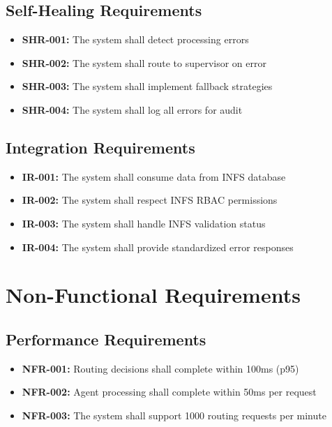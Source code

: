 \subsection{Self-Healing Requirements}

\begin{itemize}
    \item \textbf{SHR-001:} The system shall detect processing errors
    \item \textbf{SHR-002:} The system shall route to supervisor on error
    \item \textbf{SHR-003:} The system shall implement fallback strategies
    \item \textbf{SHR-004:} The system shall log all errors for audit
\end{itemize}

\subsection{Integration Requirements}

\begin{itemize}
    \item \textbf{IR-001:} The system shall consume data from INFS database
    \item \textbf{IR-002:} The system shall respect INFS RBAC permissions
    \item \textbf{IR-003:} The system shall handle INFS validation status
    \item \textbf{IR-004:} The system shall provide standardized error responses
\end{itemize}

\section{Non-Functional Requirements}

\subsection{Performance Requirements}

\begin{itemize}
    \item \textbf{NFR-001:} Routing decisions shall complete within 100ms (p95)
    \item \textbf{NFR-002:} Agent processing shall complete within 50ms per request
    \item \textbf{NFR-003:} The system shall support 1000 routing requests per minute
\end{itemize}

